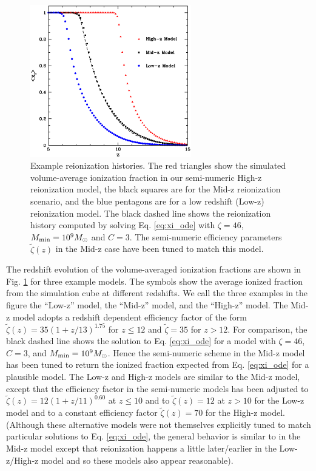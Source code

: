 \begin{figure}
\bc
\includegraphics[width=7cm]{f1.eps}
\caption{Example reionization histories. The red triangles show the simulated volume-average ionization fraction in our semi-numeric High-z reionization model, the
black squares are for the Mid-z reionization scenario, and the blue pentagons are for a low redshift (Low-z) reionization model. The black dashed line shows the reionization
history computed by solving Eq. \ref{eq:xi_ode} with $\zeta=46$, $M_{\rm min} = 10^9 M_\odot$ and $C=3$. The semi-numeric
efficiency parameters $\tilde{\zeta}(z)$ in the Mid-z case have been tuned to match this model.}
\label{fig:xi_examp}
\ec
\end{figure}

The redshift evolution of the volume-averaged ionization fractions are shown in Fig. \ref{fig:xi_examp} for three example models. The symbols
show the average ionized fraction from the simulation cube at different redshifts. We call the three examples in the
figure the ``Low-z'' model, the ``Mid-z'' model, and the ``High-z'' model. The Mid-z model adopts a redshift dependent efficiency factor
of the form $\tilde{\zeta}(z) = 35 (1+z/13)^{1.75}$ for $z \leq 12$ and $\tilde{\zeta}=35$ for $z > 12$.
For comparison, the black dashed line shows
the solution to Eq. \ref{eq:xi_ode} for a model with $\zeta=46$, $C=3$, and $M_{\rm min} = 10^9 M_\odot$. Hence the semi-numeric scheme
in the Mid-z model has been tuned to return the ionized fraction expected from Eq. \ref{eq:xi_ode} for a plausible model.
The Low-z and High-z models are similar to the Mid-z model, except that
the efficiency factor in the semi-numeric models has been adjusted to $\tilde{\zeta}(z)=12 (1+z/11)^{0.60}$ at $z \leq 10$ and to
$\tilde{\zeta}(z)=12$ at $z > 10$ for the Low-z model and to a constant efficiency factor $\tilde{\zeta}(z)=70$ for the High-z model. (Although these 
alternative models were not themselves explicitly tuned to match particular solutions to Eq. \ref{eq:xi_ode}, the general
behavior is similar to in the Mid-z model except that reionization happens a little later/earlier in the Low-z/High-z model and
so these models also appear reasonable).

